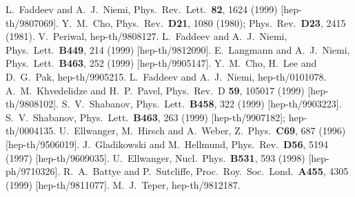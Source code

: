 \documentclass[a4paper,12pt]{article}
\begin{document}
\begin{thebibliography}{99}

L.~Faddeev and A.~J.~Niemi,
Phys.\ Rev.\ Lett.\  {\bf 82}, 1624 (1999)
[hep-th/9807069].
%
Y.~M.~Cho,
Phys.\ Rev.\  {\bf D21}, 1080 (1980);
Phys.\ Rev.\  {\bf D23}, 2415 (1981).
V.~Periwal,
hep-th/9808127.
%
L.~Faddeev and A.~J.~Niemi,
Phys.\ Lett.\  {\bf B449}, 214 (1999)
[hep-th/9812090].
%
E.~Langmann and A.~J.~Niemi,
Phys.\ Lett.\  {\bf B463}, 252 (1999)
[hep-th/9905147].
%
Y.~M.~Cho, H.~Lee and D.~G.~Pak,
hep-th/9905215.
%
L.~Faddeev and A.~J.~Niemi,
hep-th/0101078.
%
A.~M.~Khvedelidze and H.~P.~Pavel,
Phys.\ Rev.\ D {\bf 59}, 105017 (1999)
[hep-th/9808102].
%
S.~V.~Shabanov,
Phys.\ Lett.\  {\bf B458}, 322 (1999)
[hep-th/9903223].
S.~V.~Shabanov,
Phys.\ Lett.\  {\bf B463}, 263 (1999)
[hep-th/9907182];
hep-th/0004135.
%
U.~Ellwanger, M.~Hirsch and A.~Weber,
Z.\ Phys.\  {\bf C69}, 687 (1996)
[hep-th/9506019].
%
J.~Gladikowski and M.~Hellmund,
Phys.\ Rev.\  {\bf D56}, 5194 (1997)
[hep-th/9609035].
%
U.~Ellwanger,
Nucl.\ Phys.\  {\bf B531}, 593 (1998)
[hep-ph/9710326].
%
R.~A.~Battye and P.~Sutcliffe,
Proc.\ Roy.\ Soc.\ Lond.\  {\bf A455}, 4305 (1999)
[hep-th/9811077].
%
M.~J.~Teper,
hep-th/9812187.


\end{thebibliography}
\end{document}
